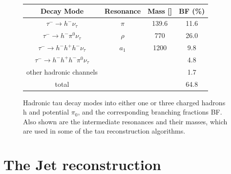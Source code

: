 \begin{figure}[tbh!]
	\begin{center}	
			\begin{tabular}{ | c | c | c | c |}
				\hline
				Decay Mode & Resonance & Mass [\mev] & BF (\%) \\ \hline
				\hline
				$\tau^{-}\longrightarrow h^{-}\nu_{\tau}$& $\pi$ & 139.6 & 11.6 \\ \hline
				$\tau^{-}\longrightarrow h^{-}\pi^{0}\nu_{\tau}$& $\rho$ & 770 & 26.0 \\ \hline
				$\tau^{-}\longrightarrow h^{-} h^{+} h^{-} \nu_{\tau}$& $a_{1}$& 1200 & 9.8 \\ \hline
				$\tau^{-}\longrightarrow h^{-} h^{+} h^{-} \pi^{0}\nu_{\tau}$& & & 4.8 \\ \hline
				other hadronic channels& & & 1.7 \\ \hline
				\hline
				total & & & 64.8 \\ \hline
				\hline
			\end{tabular}
		\caption{ Hadronic tau decay modes into either one or three charged hadrons h and potential $\pi_{0}$, and the corresponding branching fractions BF. Also shown are the intermediate resonances and their masses, which are used in some of the tau reconstruction algorithms.}
		\label{table:tau_hdecay}
	\end{center}
\end{figure}

\clearpage
\section {The Jet reconstruction}

